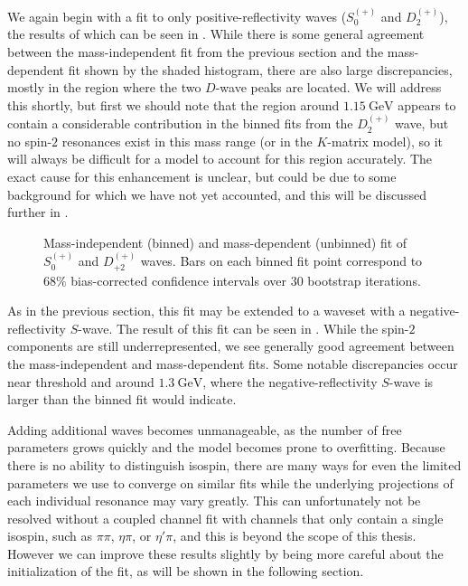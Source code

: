 We again begin with a fit to only positive-reflectivity waves ($S_0^{(+)}$ and $D_2^{(+)}$), the results of which can be seen in . While there is some general agreement between the mass-independent fit from the previous section and the mass-dependent fit shown by the shaded histogram, there are also large discrepancies, mostly in the region where the two $D$-wave peaks are located. We will address this shortly, but first we should note that the region around $\SI{1.15}{\giga\electronvolt}$ appears to contain a considerable contribution in the binned fits from the $D_2^{(+)}$ wave, but no spin-$2$ resonances exist in this mass range (or in the $K$-matrix model), so it will always be difficult for a model to account for this region accurately. The exact cause for this enhancement is unclear, but could be due to some background for which we have not yet accounted, and this will be discussed further in .

\begin{figure}
  \begin{center}
    
  \end{center}
  \caption{Mass-independent (binned) and mass-dependent (unbinned) fit of $S_{0}^{(+)}$ and $D_{+2}^{(+)}$ waves. Bars on each binned fit point correspond to $68\%$ bias-corrected confidence intervals over $ 30 $ bootstrap iterations.}\label{fig:unbinned-fit-chisqdof-3.0-Sp-D2p}
\end{figure}

As in the previous section, this fit may be extended to a waveset with a negative-reflectivity $S$-wave. The result of this fit can be seen in . While the spin-$2$ components are still underrepresented, we see generally good agreement between the mass-independent and mass-dependent fits. Some notable discrepancies occur near threshold and around $\SI{1.3}{\giga\electronvolt}$, where the negative-reflectivity $S$-wave is larger than the binned fit would indicate.

Adding additional waves becomes unmanageable, as the number of free parameters grows quickly and the model becomes prone to overfitting. Because there is no ability to distinguish isospin, there are many ways for even the limited parameters we use to converge on similar fits while the underlying projections of each individual resonance may vary greatly. This can unfortunately not be resolved without a coupled channel fit with channels that only contain a single isospin, such as $\pi\pi$, $\eta\pi$, or $\eta'\pi$, and this is beyond the scope of this thesis. However we can improve these results slightly by being more careful about the initialization of the fit, as will be shown in the following section.

